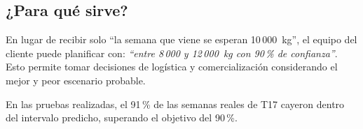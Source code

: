 \documentclass[11pt,a4paper]{article}
\begin{document}
\subsection*{¿Para qué sirve?}

En lugar de recibir solo ``la semana que viene se esperan 10\,000~kg'', el equipo del cliente puede planificar con: \emph{``entre 8\,000 y 12\,000~kg con 90\,\% de confianza''}. Esto permite tomar decisiones de logística y comercialización considerando el mejor y peor escenario probable.

\begin{infobox}
En las pruebas realizadas, el 91\,\% de las semanas reales de T17 cayeron dentro del intervalo predicho, superando el objetivo del 90\,\%.
\end{infobox}
\end{document}
